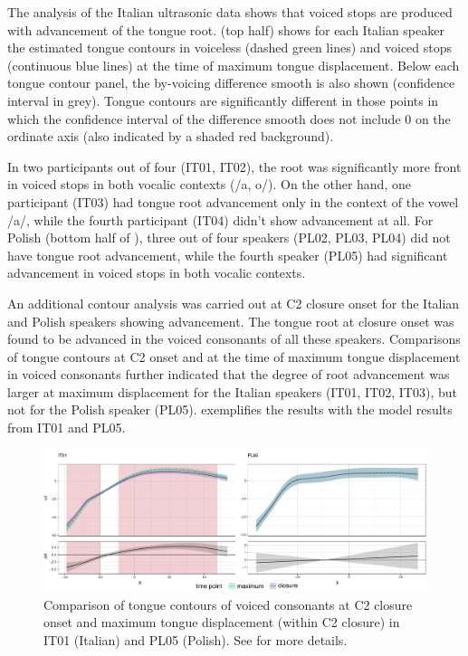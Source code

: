 \documentclass[authoryear, 5p]{elsarticle}
\begin{document}
The analysis of the Italian ultrasonic data shows that voiced stops are
produced with advancement of the tongue root.  (top half)
shows for each Italian speaker the estimated tongue contours in
voiceless (dashed green lines) and voiced stops (continuous blue lines)
at the time of maximum tongue displacement. Below each tongue contour
panel, the by-voicing difference smooth is also shown (confidence
interval in grey). Tongue contours are significantly different in those
points in which the confidence interval of the difference smooth does
not include 0 on the ordinate axis (also indicated by a shaded red
background).

In two participants out of four (IT01, IT02), the root was significantly
more front in voiced stops in both vocalic contexts (/a, o/). On the
other hand, one participant (IT03) had tongue root advancement only in
the context of the vowel /a/, while the fourth participant (IT04) didn't
show advancement at all. For Polish (bottom half of ), three
out of four speakers (PL02, PL03, PL04) did not have tongue root
advancement, while the fourth speaker (PL05) had significant advancement
in voiced stops in both vocalic contexts.

An additional contour analysis was carried out at C2 closure onset for
the Italian and Polish speakers showing advancement. The tongue root at
closure onset was found to be advanced in the voiced consonants of all
these speakers. Comparisons of tongue contours at C2 onset and at the
time of maximum tongue displacement in voiced consonants further
indicated that the degree of root advancement was larger at maximum
displacement for the Italian speakers (IT01, IT02, IT03), but not for
the Polish speaker (PL05).  exemplifies the results with
the model results from IT01 and PL05.

\begin{figure}
    \centering
    \includegraphics[width=.9\textwidth]{fig/voiced-colour.pdf}
    \caption{Comparison of tongue contours of voiced consonants at C2 closure onset and maximum tongue displacement (within C2 closure) in IT01 (Italian) and PL05 (Polish). See  for more details.}
    \label{f:voiced}
\end{figure}
\end{document}
